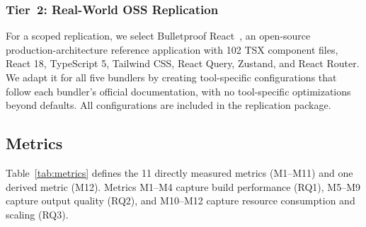 \documentclass[preprint,12pt]{elsarticle}
\begin{document}
\subsubsection{Tier~2: Real-World OSS Replication}\label{sec:tier2}

For a scoped replication, we select Bulletproof React~\cite{bulletproofreact2024}, an open-source production-architecture reference application with 102 TSX component files, React 18, TypeScript 5, Tailwind CSS, React Query, Zustand, and React Router.
We adapt it for all five bundlers by creating tool-specific configurations that follow each bundler's official documentation, with no tool-specific optimizations beyond defaults.
All configurations are included in the replication package.

\subsection{Metrics}\label{sec:metrics}

Table~\ref{tab:metrics} defines the 11 directly measured metrics (M1--M11) and one derived metric (M12).
Metrics M1--M4 capture build performance (RQ1), M5--M9 capture output quality (RQ2), and M10--M12 capture resource consumption and scaling (RQ3).
\end{document}
